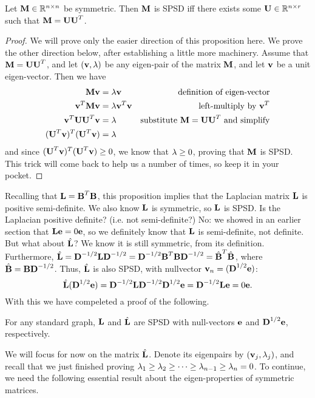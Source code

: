 \begin{theorem}\label{thm:spsd:decomposition}
  Let $\textbf{M} \in \mathbb{R}^{n \times n}$ be symmetric. Then $\textbf{M}$ is SPSD iff there exists some $\textbf{U} \in \mathbb{R}^{n \times r}$ such that $\textbf{M} = \textbf{U} \textbf{U}^T$.
\end{theorem}
\begin{proof}
We will prove only the easier direction of this proposition here. We prove the other direction below, after establishing a little more machinery. Assume that $\textbf{M} = \textbf{U}\textbf{U}^T$, and let $(\textbf{v}, \lambda)$ be any eigen-pair of the matrix $\textbf{M}$, and let $\textbf{v}$ be a unit eigen-vector. Then we have
\begin{align}
  \textbf{M}\textbf{v} &= \lambda \textbf{v} & \text{definition of eigen-vector} \\
  \textbf{v}^T \textbf{M} \textbf{v} &= \lambda \textbf{v}^T\textbf{v} & \text{left-multiply by $\textbf{v}^T$} \\
  \textbf{v}^T\textbf{U} \textbf{U}^T \textbf{v} &= \lambda & \text{substitute $\textbf{M} = \textbf{U}\textbf{U}^T$ and simplify} \\
  (\textbf{U}^T\textbf{v})^T (\textbf{U}^T\textbf{v}) &= \lambda
\end{align}
and since $(\textbf{U}^T\textbf{v})^T (\textbf{U}^T\textbf{v}) \geq 0$, we know that $\lambda \geq 0$, proving that $\textbf{M}$ is SPSD. This trick will come back to help us a number of times, so keep it in your pocket.
\end{proof}

Recalling that $\textbf{L} = \textbf{B}^T\textbf{B}$, this proposition implies that the Laplacian matrix $\textbf{L}$ is positive semi-definite. We also know $\textbf{L}$ is symmetric, so $\textbf{L}$ is SPSD. Is the Laplacian positive definite? (i.e. not semi-definite?) No: we showed in an earlier section that $\textbf{L}\textbf{e} = 0\textbf{e}$, so we definitely know that $\textbf{L}$ is semi-definite, not definite.
But what about $\hat{\textbf{L}}$? We know it is still symmetric, from its definition.
Furthermore, $\hat{\textbf{L}} = \textbf{D}^{-1/2}\textbf{L}\textbf{D}^{-1/2} = \textbf{D}^{-1/2}\textbf{B}^T\textbf{B}\textbf{D}^{-1/2} = \hat{\textbf{B}}^T\hat{\textbf{B}}$, where $\hat{\textbf{B}} = \textbf{B}\textbf{D}^{-1/2}$. Thus, $\hat{\textbf{L}}$ is also SPSD, with nullvector $\textbf{v}_n = (\textbf{D}^{1/2}\textbf{e})$:
\[
\hat{\textbf{L}} (\textbf{D}^{1/2}\textbf{e}) = \textbf{D}^{-1/2}\textbf{L}\textbf{D}^{-1/2} \textbf{D}^{1/2}\textbf{e} = \textbf{D}^{-1/2} \textbf{L}\textbf{e} = 0 \textbf{e}.
\]
With this we have compeleted a proof of the following.
\begin{proposition}
  For any standard graph, $\textbf{L}$ and $\hat{\textbf{L}}$ are SPSD with null-vectors $\textbf{e}$ and $\textbf{D}^{1/2}\textbf{e}$, respectively.
\end{proposition}

We will focus for now on the matrix $\hat{\textbf{L}}$. Denote its eigenpairs by $(\textbf{v}_j, \lambda_j)$, and recall that we just finished proving $\lambda_1 \geq \lambda_2 \geq \cdots \geq \lambda_{n-1} \geq \lambda_n = 0$.
To continue, we need the following essential result about the eigen-properties of symmetric matrices.

